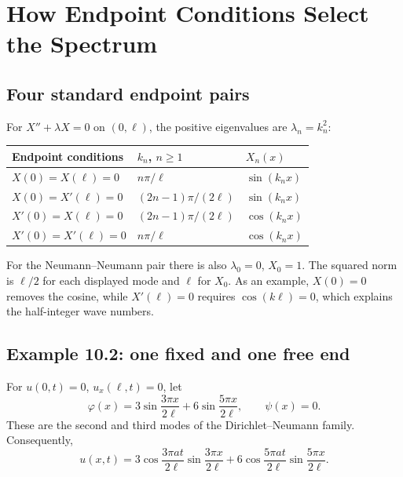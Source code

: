\documentclass[11pt,a4paper]{article}
\begin{document}
\section{How Endpoint Conditions Select the Spectrum}
\subsection{Four standard endpoint pairs}
For $X''+\lambda X=0$ on $(0,\ell)$, the positive eigenvalues are $\lambda_n=k_n^2$:
\begin{center}
\small
\begin{tabular}{@{}lll@{}}
\toprule
Endpoint conditions & $k_n$, $n\ge1$ & $X_n(x)$\\
\midrule
$X(0)=X(\ell)=0$ & $n\pi/\ell$ & $\sin(k_nx)$\\[3pt]
$X(0)=X'(\ell)=0$ & $(2n-1)\pi/(2\ell)$ & $\sin(k_nx)$\\[3pt]
$X'(0)=X(\ell)=0$ & $(2n-1)\pi/(2\ell)$ & $\cos(k_nx)$\\[3pt]
$X'(0)=X'(\ell)=0$ & $n\pi/\ell$ & $\cos(k_nx)$\\
\bottomrule
\end{tabular}
\end{center}
For the Neumann--Neumann pair there is also $\lambda_0=0$, $X_0=1$.
The squared norm is $\ell/2$ for each displayed mode and $\ell$ for $X_0$.
As an example, $X(0)=0$ removes the cosine, while $X'(\ell)=0$ requires
$\cos(k\ell)=0$, which explains the half-integer wave numbers.

\subsection{Example 10.2: one fixed and one free end}
For $u(0,t)=0$, $u_x(\ell,t)=0$, let
\begin{equation}
 \varphi(x)=3\sin\frac{3\pi x}{2\ell}+6\sin\frac{5\pi x}{2\ell},\qquad
 \psi(x)=0.
\end{equation}
These are the second and third modes of the Dirichlet--Neumann family.
Consequently,
\begin{equation}
 u(x,t)=3\cos\frac{3\pi at}{2\ell}\sin\frac{3\pi x}{2\ell}
       +6\cos\frac{5\pi at}{2\ell}\sin\frac{5\pi x}{2\ell}.
\end{equation}

\end{document}
